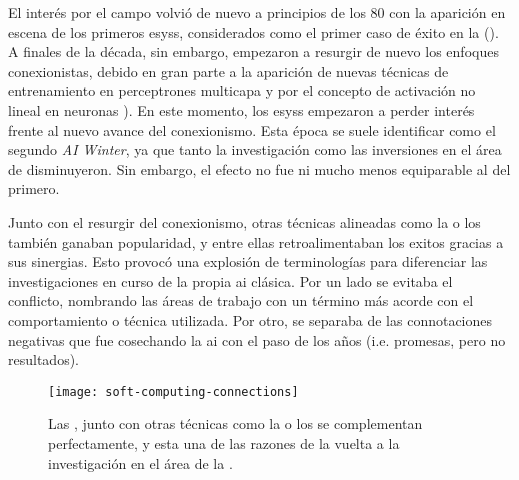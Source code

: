 El interés por el campo volvió de nuevo a principios de los $80$ con la aparición en escena de los primeros \glspl{esys}, considerados como el primer caso de éxito en la  (\cite{russell2003artificial}). A finales de la década, sin embargo, empezaron a resurgir de nuevo los enfoques conexionistas, debido en gran parte a la aparición de nuevas técnicas de entrenamiento en perceptrones multicapa y por el concepto de activación no lineal en neuronas \cite{rumelhart1985learning, cybenko1989approximation}). En este momento, los \glspl{esys} empezaron a perder interés frente al nuevo avance del conexionismo. Esta época se suele identificar como el segundo \textit{AI Winter}, ya que tanto la investigación como las inversiones en el área de  disminuyeron. Sin embargo, el efecto no fue ni mucho menos equiparable al del primero.

Junto con el resurgir del conexionismo, otras técnicas alineadas como la  o los  también ganaban popularidad, y entre ellas retroalimentaban los exitos gracias a sus sinergias. Esto provocó una explosión de terminologías para diferenciar las investigaciones en curso de la propia \gls{ai} clásica. Por un lado se evitaba el conflicto, nombrando las áreas de trabajo con un término más acorde con el comportamiento o técnica utilizada. Por otro, se separaba de las connotaciones negativas que fue cosechando la \gls{ai} con el paso de los años (i.e. promesas, pero no resultados).

\begin{figure}[!b]
	\texttt{[image: soft-computing-connections]}
	\caption[Sinergias entre técnicas del \gls{sc}]{Las , junto con otras técnicas como la  o los  se complementan perfectamente, y esta una de las razones de la vuelta a la investigación en el área de la .}
	\label{fig:soft-computing-connections}
\end{figure}

